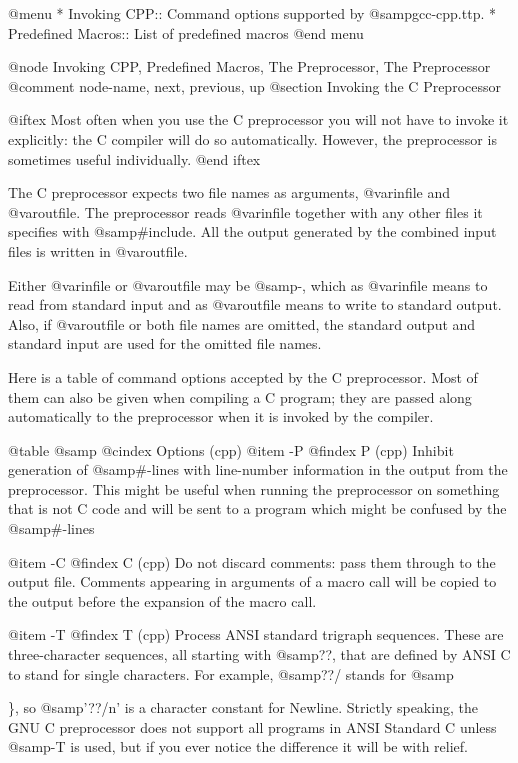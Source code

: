 {{@menu
* Invoking CPP::       Command options supported by @samp{gcc-cpp.ttp}.
* Predefined Macros::  List of predefined macros
@end menu

@node     Invoking CPP, Predefined Macros, The Preprocessor, The Preprocessor
@comment  node-name,    next,              previous,         up
@section Invoking the C Preprocessor

@iftex
Most often when you use the C preprocessor you will not have to invoke it
explicitly: the C compiler will do so automatically.  However, the
preprocessor is sometimes useful individually.
@end iftex

The C preprocessor expects two file names as arguments, @var{infile} and
@var{outfile}. The preprocessor reads @var{infile} together with any other
files it specifies with @samp{#include}.  All the output generated by the
combined input files is written in @var{outfile}.

Either @var{infile} or @var{outfile} may be @samp{-}, which as @var{infile}
means to read from standard input and as @var{outfile} means to write to
standard output.  Also, if @var{outfile} or both file names are omitted,
the standard output and standard input are used for the omitted file names.

Here is a table of command options accepted by the C preprocessor.  Most
of them can also be given when compiling a C program; they are passed along
automatically to the preprocessor when it is invoked by the compiler.

@table @samp
@cindex Options (cpp)
@item -P
@findex P (cpp)
Inhibit generation of @samp{#}-lines with line-number information in the
output from the preprocessor. This might be useful when running the
preprocessor on something that is not C code and will be sent to a
program which might be confused by the @samp{#}-lines

@item -C
@findex C (cpp)
Do not discard comments: pass them through to the output file.
Comments appearing in arguments of a macro call will be copied to the
output before the expansion of the macro call.

@item -T
@findex T (cpp)
Process ANSI standard trigraph sequences.  These are three-character
sequences, all starting with @samp{??}, that are defined by ANSI C to
stand for single characters.  For example, @samp{??/} stands for
@samp{\}, so @samp{'??/n'} is a character constant for Newline.
Strictly speaking, the GNU C preprocessor does not support all
programs in ANSI Standard C unless @samp{-T} is used, but if you
ever notice the difference it will be with relief.

}}}
